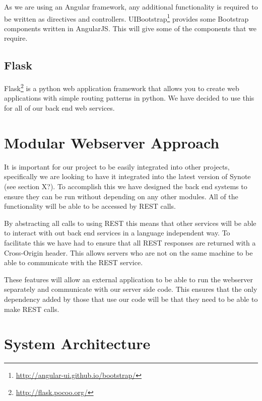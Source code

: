 As we are using an Angular framework, any additional functionality is required to be written as directives and controllers. UIBootstrap\footnote{\url{http://angular-ui.github.io/bootstrap/}} provides some Bootstrap components written in AngularJS. This will give some of the components that we require.

\subsection{Flask}
\label{Section:Flask}
Flask\footnote{\url{http://flask.pocoo.org/}} is a python web application framework that allows you to create web applications with simple routing patterns in python. We have decided to use this for all of our back end web services.

\section{Modular Webserver Approach}
\label{Section:Modular Approach}
It is important for our project to be easily integrated into other projects, specifically we are looking to have it integrated into the latest version of Synote (see section X?). To accomplish this we have designed the back end systems to ensure they can be run without depending on any other modules. All of the functionality will be able to be accessed by REST calls.

By abstracting all calls to using REST this means that other services will be able to interact with out back end services in a language independent way. To facilitate this we have had to ensure that all REST responses are returned with a Cross-Origin header. This allows servers who are not on the same machine to be able to communicate with the REST service.

These features will allow an external application to be able to run the webserver separately and communicate with our server side code. This ensures that the only dependency added by those that use our code will be that they need to be able to make REST calls.

\section{System Architecture}


